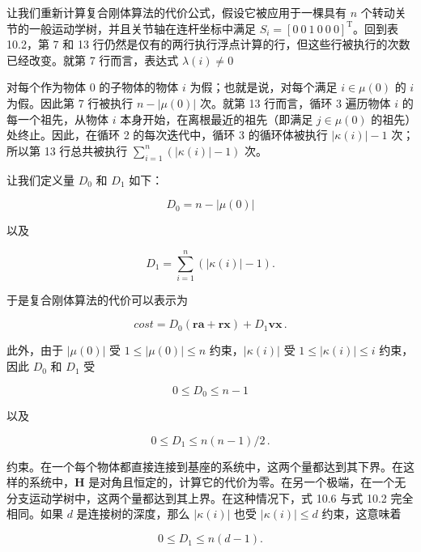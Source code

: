 \documentclass[10pt,a4paper]{book}
\theoremstyle{thmstyle} %
\theoremstyle{defstyle} %
\theoremstyle{prostyle} %
\begin{document}
让我们重新计算复合刚体算法的代价公式，假设它被应用于一棵具有 $n$ 个转动关节的一般运动学树，并且关节轴在连杆坐标中满足 $S_i = [0 \ 0 \ 1 \ 0 \ 0 \ 0]^\text{T}$。回到表 10.2，第 7 和 13 行仍然是仅有的两行执行浮点计算的行，但这些行被执行的次数已经改变。就第 7 行而言，表达式 $\lambda(i) \neq 0$



对每个作为物体 0 的子物体的物体 $i$ 为假；也就是说，对每个满足 $i \in \mu(0)$ 的 $i$ 为假。因此第 7 行被执行 $n - |\mu(0)|$ 次。就第 13 行而言，循环 3 遍历物体 $i$ 的每一个祖先，从物体 $i$ 本身开始，在离根最近的祖先（即满足 $j \in \mu(0)$ 的祖先）处终止。因此，在循环 2 的每次迭代中，循环 3 的循环体被执行 $|\kappa(i)| - 1$ 次；所以第 13 行总共被执行 $\sum_{i=1}^{n}(|\kappa(i)| - 1)$ 次。



让我们定义量 $D_{0}$ 和 $D_{1}$ 如下：



$$
D _ { 0 } = n - | \mu ( 0 ) |
$$



以及



$$
D _ { 1 } = \sum _ { i = 1 } ^{n} \left( \left| \kappa ( i ) \right| - 1 \right) .
$$



于是复合刚体算法的代价可以表示为



$$
c o s t = D _ { 0 } ( \mathbf { r a } + \mathbf { r x } ) + D _ { 1 } \mathbf { v x } \, .
$$



此外，由于 $|\mu(0)|$ 受 $1 \leq |\mu(0)| \leq n$ 约束，$|\kappa(i)|$ 受 $1 \leq |\kappa(i)| \leq i$ 约束，因此 $D_0$ 和 $D_1$ 受



$$
0 \leq D _ { 0 } \leq n - 1
$$



以及



$$
0 \leq D _ { 1 } \leq n ( n - 1 ) / 2 \, .
$$



约束。在一个每个物体都直接连接到基座的系统中，这两个量都达到其下界。在这样的系统中，$\mathbf{H}$ 是对角且恒定的，计算它的代价为零。在另一个极端，在一个无分支运动学树中，这两个量都达到其上界。在这种情况下，式 10.6 与式 10.2 完全相同。如果 $d$ 是连接树的深度，那么 $|\kappa(i)|$ 也受 $|\kappa(i)| \leq d$ 约束，这意味着



$$
0 \leq D _ { 1 } \leq n ( d - 1 ) .
$$
\end{document}
